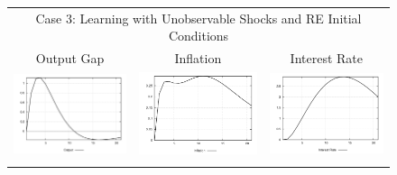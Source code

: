 \begin{figure}
\begin{tabular}{ccc}
\multicolumn{3}{c}{Case 3: Learning with Unobservable Shocks and RE Initial Conditions}\\
Output Gap & Inflation & Interest Rate \\ 
\includegraphics[scale=0.28]{results_reinit/Output_natshock_irf.png} & 
\includegraphics[scale=0.28]{results_reinit/Inflation_natshock_irf.png} & 
\includegraphics[scale=0.28]{results_reinit/Interest_Rate_natshock_irf.png} \\ \\ 

\end{tabular}
\end{figure}
